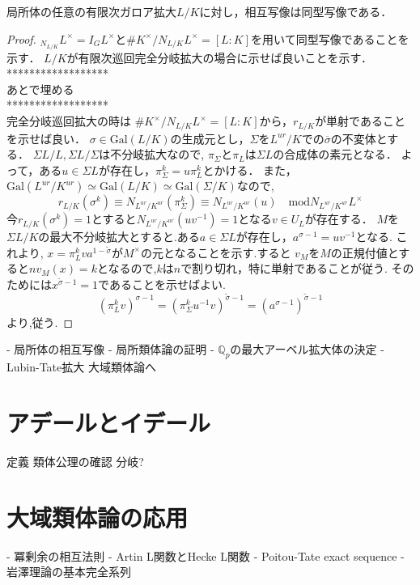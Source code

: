 \documentclass{ujarticle}
\begin{document}
\begin{thm}
 局所体の任意の有限次ガロア拡大$L/K$に対し，相互写像は同型写像である．
\end{thm}
\begin{proof}
$ _{N_{L/K}}L^{\times} = I_G L^{\times}$と$\# K^{\times}/N_{L/K}L^{\times} =[L:K]$を用いて同型写像であることを示す．
$L/K$が有限次巡回完全分岐拡大の場合に示せば良いことを示す．
******************\\
あとで埋める \\
******************\\
完全分岐巡回拡大の時は
$\# K^{\times}/N_{L/K}L^{\times} =[L:K]$から，$r_{L/K}$が単射であることを示せば良い．
$\sigma \in \mathrm{Gal}(L/K)$の生成元とし，$\Sigma$を$L^{ur}/K$での$\overline{\sigma}$の不変体とする．
$\Sigma L/L,\Sigma L/\Sigma$は不分岐拡大なので,
$\pi_{\Sigma}$と$\pi_L$は$\Sigma L$の合成体の素元となる．
よって，ある$u \in \Sigma L$が存在し，$\pi_{\Sigma}^k = u \pi_L^k$とかける．
また，$\mathrm{Gal}(L^{ur}/K^{ur}) \simeq \mathrm{Gal}(L/K) \simeq \mathrm{Gal}(\Sigma/K)$なので,
\begin{equation*}
 r_{L/K}(\sigma^k) \equiv N_{L^{ur}/K^{ur}}(\pi_{\Sigma}^k) \equiv N_{L^{ur}/K^{ur}}(u) \quad \mbox{mod} N_{L^{ur}/K^{ur}}L^{\times}
\end{equation*}
今$r_{L/K}(\sigma^k)=1$とすると$N_{L^{ur}/K^{ur}}(uv^{-1})=1$となる$v \in U_L$が存在する．
$M$を$\Sigma L/K$の最大不分岐拡大とすると.ある$a \in \Sigma L$が存在し，$ a^{\sigma -1}= uv^{-1}$となる.
これより,
$x=\pi_L^kva^{1-\tilde{\sigma}}$が$M^{\times}$の元となることを示す.すると
$v_M$を$M$の正規付値とすると$nv_M(x)=k$となるので,$k$は$n$で割り切れ，特に単射であることが従う.
そのためには$x^{\tilde{\sigma} -1} =1$であることを示せばよい.
\begin{equation*}
(\pi_L^kv)^{\sigma -1}= (\pi_{\Sigma}^ku^{-1}v)^{\tilde{\sigma}-1} =(a^{\sigma -1})^{\tilde{\sigma}-1}
\end{equation*}
より,従う.
\end{proof}


- 局所体の相互写像
- 局所類体論の証明
- $\mathbb{Q}_p$の最大アーベル拡大体の決定
- Lubin-Tate拡大
大域類体論へ

\section{アデールとイデール}
\label{sec:アデールとイデール}
定義
類体公理の確認
分岐?

\section{大域類体論の応用}
\label{sec:大域類体論の応用}
- 冪剰余の相互法則
- Artin L関数とHecke L関数
- Poitou-Tate exact sequence
- 岩澤理論の基本完全系列



\end{document}
